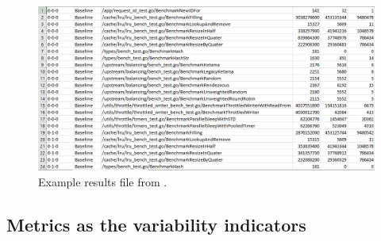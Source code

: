 \documentclass{seal_thesis}
\begin{document}
\clearpage

\begin{figure}[H]
	\centering
	\includegraphics[width=\linewidth]{exampleresults}
	\caption{Example results file from \cite{ironsmile/nedomi}.}
	\label{fig:exampleresults}
\end{figure}
 
\subsection{Metrics as the variability indicators}
\end{document}
